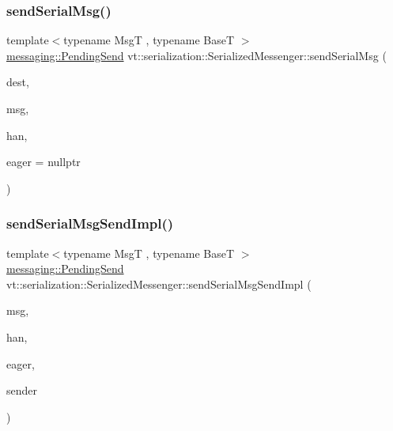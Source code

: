 \subsubsection{\texorpdfstring{send\+Serial\+Msg()}{sendSerialMsg()}}
{\footnotesize\ttfamily template$<$typename MsgT , typename BaseT $>$ \\
\hyperlink{structvt_1_1messaging_1_1_pending_send}{messaging\+::\+Pending\+Send} vt\+::serialization\+::\+Serialized\+Messenger\+::send\+Serial\+Msg (\begin{DoxyParamCaption}\item[{\hyperlink{namespacevt_a866da9d0efc19c0a1ce79e9e492f47e2}{Node\+Type}}]{dest,  }\item[{MsgT $\ast$}]{msg,  }\item[{\hyperlink{namespacevt_af64846b57dfcaf104da3ef6967917573}{Handler\+Type}}]{han,  }\item[{\hyperlink{namespacevt_1_1serialization_a009aa1de8d42a3c97643b947fcc6f0b6}{Action\+Eager\+Send}$<$ MsgT, BaseT $>$}]{eager = {\ttfamily nullptr} }\end{DoxyParamCaption})\hspace{0.3cm}{\ttfamily [static]}}

\mbox{\label{structvt_1_1serialization_1_1_serialized_messenger_abf1608ea281ed8c48f521ac1e90d9969}} 
\subsubsection{\texorpdfstring{send\+Serial\+Msg\+Send\+Impl()}{sendSerialMsgSendImpl()}}
{\footnotesize\ttfamily template$<$typename MsgT , typename BaseT $>$ \\
\hyperlink{structvt_1_1messaging_1_1_pending_send}{messaging\+::\+Pending\+Send} vt\+::serialization\+::\+Serialized\+Messenger\+::send\+Serial\+Msg\+Send\+Impl (\begin{DoxyParamCaption}\item[{MsgT $\ast$}]{msg,  }\item[{\hyperlink{namespacevt_af64846b57dfcaf104da3ef6967917573}{Handler\+Type}}]{han,  }\item[{\hyperlink{namespacevt_1_1serialization_a009aa1de8d42a3c97643b947fcc6f0b6}{Action\+Eager\+Send}$<$ MsgT, BaseT $>$}]{eager,  }\item[{\hyperlink{namespacevt_1_1serialization_afffcac0da80b78e77ef8043dba4e814f}{Action\+Data\+Send}}]{sender }\end{DoxyParamCaption})\hspace{0.3cm}{\ttfamily [static]}}

